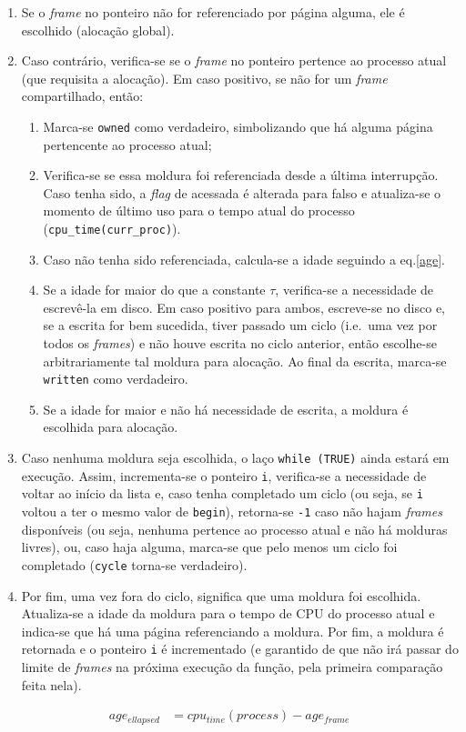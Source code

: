 \documentclass{article}
\begin{document}
\begin{enumerate}
    \item Se o \textit{frame} no ponteiro não for referenciado por página
        alguma, ele é escolhido (alocação global).
    \item Caso contrário, verifica-se se o \textit{frame} no ponteiro pertence
        ao processo atual (que requisita a alocação). Em caso positivo, se não
        for um \textit{frame} compartilhado, então:
        \begin{enumerate}
            \item Marca-se \texttt{owned} como verdadeiro, simbolizando que há
                alguma página pertencente ao processo atual;
            \item Verifica-se se essa moldura foi referenciada desde a última
                interrupção. Caso tenha sido, a \textit{flag} de acessada é
                alterada para falso e atualiza-se o momento de último uso para
                o tempo atual do processo (\texttt{cpu\_time(curr\_proc)}).
            \item Caso não tenha sido referenciada, calcula-se a idade seguindo
                a eq.\ref{age}.
            \item Se a idade for maior do que a constante $\tau$, verifica-se a
                necessidade de escrevê-la em disco. Em caso positivo para
                ambos, escreve-se no disco e, se a escrita for bem sucedida,
                tiver passado um ciclo (i.e.\ uma vez por todos os
                \textit{frames}) e não houve escrita no ciclo anterior, então
                escolhe-se arbitrariamente tal moldura para alocação. Ao final
                da escrita, marca-se \texttt{written} como verdadeiro.
            \item Se a idade for maior e não há necessidade de escrita, a
                moldura é escolhida para alocação.
        \end{enumerate}
    \item Caso nenhuma moldura seja escolhida, o laço \texttt{while (TRUE)}
        ainda estará em execução. Assim, incrementa-se o ponteiro \texttt{i},
        verifica-se a necessidade de voltar ao início da lista e, caso tenha
        completado um ciclo (ou seja, se \texttt{i} voltou a ter o mesmo valor
        de \texttt{begin}), retorna-se \texttt{-1} caso não hajam
        \textit{frames} disponíveis (ou seja, nenhuma pertence ao processo
        atual e não há molduras livres), ou, caso haja alguma, marca-se que
        pelo menos um ciclo foi completado (\texttt{cycle} torna-se
        verdadeiro).
    \item Por fim, uma vez fora do ciclo, significa que uma moldura foi
        escolhida. Atualiza-se a idade da moldura para o tempo de CPU do
        processo atual e indica-se que há uma página referenciando a moldura.
        Por fim, a moldura é retornada e o ponteiro \texttt{i} é incrementado
        (e garantido de que não irá passar do limite de \textit{frames} na
        próxima execução da função, pela primeira comparação feita nela).
\end{enumerate}

\begin{align}
    \label{age}
    age_{ellapsed} &= cpu_{time}(process) - age_{frame}
\end{align}



\end{document}
